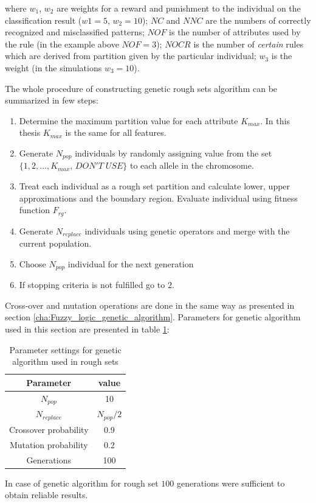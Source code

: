 where $w_1$, $w_2$ are weights for a reward and punishment to
the individual on the classification result ($w1=5$, $w_2=10$); $NC$ and $NNC$ are
the numbers of correctly recognized and misclassified patterns; $NOF$ is the number of
attributes used by the rule (in the example above $NOF=3$);
$NOCR$ is the number of \textit{certain} rules which are derived from
partition given by the particular individual; $w_3$ is the weight (in the simulations
$w_3=10$).


The whole procedure of constructing genetic rough sets algorithm can be summarized in few steps:
\begin{enumerate}
    \item Determine the maximum partition value for each attribute $K_{max}$. In
        this thesis $K_{max}$ is the same for all features.
    \item Generate $N_{pop}$ individuals by randomly assigning value from the
        set $\{1, 2, \ldots, K_{max}, \, DON'T\; USE\}$ to each allele in the
        chromosome.
    \item Treat each individual as a rough set partition and calculate lower,
        upper approximations and the boundary region. Evaluate individual using
        fitness function $F_{rg}$.
    \item Generate $N_{replace}$ individuals using genetic operators and merge
        with the current population.
    \item Choose $N_{pop}$ individual for the next generation
    \item If stopping criteria is not fulfilled go to $2$.
\end{enumerate}
Cross-over and mutation operations are done in the same way as presented in
section \ref{cha:Fuzzy_logic_genetic_algorithm}. Parameters for genetic algorithm 
used in this section are presented in table \ref{tab:rough_genetic_parameters}:
\begin{table}[H]
    \caption{Parameter settings for genetic algorithm used in rough sets}
    \centering
    \begin{tabular}{|c|c|}
        \hline
        Parameter & value \\ \hline \hline
        $N_{pop}$ & 10 \\ \hline
        $N_{replace}$ & $N_{pop}/2$ \\ \hline
        Crossover probability & 0.9 \\ \hline
        Mutation probability & 0.2 \\ \hline
        Generations & 100 \\ \hline
    \end{tabular}
    \label{tab:rough_genetic_parameters}
\end{table}
In case of genetic algorithm for rough set $100$ generations were sufficient to
obtain reliable results.
